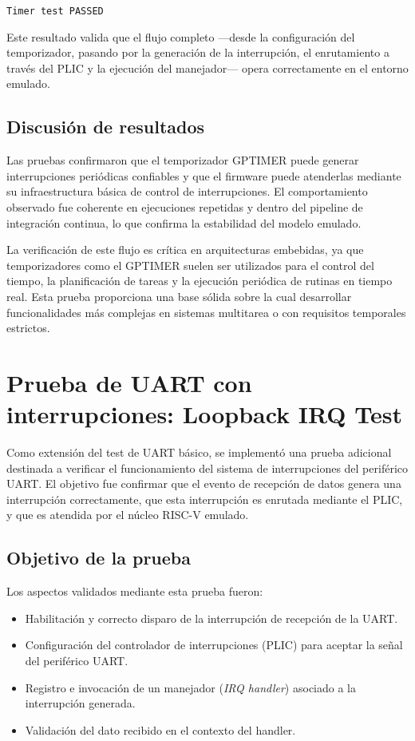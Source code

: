 \begin{verbatim}
Timer test PASSED
\end{verbatim}

Este resultado valida que el flujo completo —desde la configuración del temporizador, pasando por la generación de la interrupción, el enrutamiento a través del PLIC y la ejecución del manejador— opera correctamente en el entorno emulado.

\subsection*{Discusión de resultados}

Las pruebas confirmaron que el temporizador GPTIMER puede generar interrupciones periódicas confiables y que el firmware puede atenderlas mediante su infraestructura básica de control de interrupciones. El comportamiento observado fue coherente en ejecuciones repetidas y dentro del pipeline de integración continua, lo que confirma la estabilidad del modelo emulado.

La verificación de este flujo es crítica en arquitecturas embebidas, ya que temporizadores como el GPTIMER suelen ser utilizados para el control del tiempo, la planificación de tareas y la ejecución periódica de rutinas en tiempo real. Esta prueba proporciona una base sólida sobre la cual desarrollar funcionalidades más complejas en sistemas multitarea o con requisitos temporales estrictos.

\section{Prueba de UART con interrupciones: Loopback IRQ Test}
\label{subsec:uart-irq-test}

Como extensión del test de UART básico, se implementó una prueba adicional destinada a verificar el funcionamiento del sistema de interrupciones del periférico UART. El objetivo fue confirmar que el evento de recepción de datos genera una interrupción correctamente, que esta interrupción es enrutada mediante el PLIC, y que es atendida por el núcleo RISC-V emulado.

\subsection*{Objetivo de la prueba}

Los aspectos validados mediante esta prueba fueron:

\begin{itemize}
    \item Habilitación y correcto disparo de la interrupción de recepción de la UART.
    \item Configuración del controlador de interrupciones (PLIC) para aceptar la señal del periférico UART.
    \item Registro e invocación de un manejador (\emph{IRQ handler}) asociado a la interrupción generada.
    \item Validación del dato recibido en el contexto del handler.
\end{itemize}

